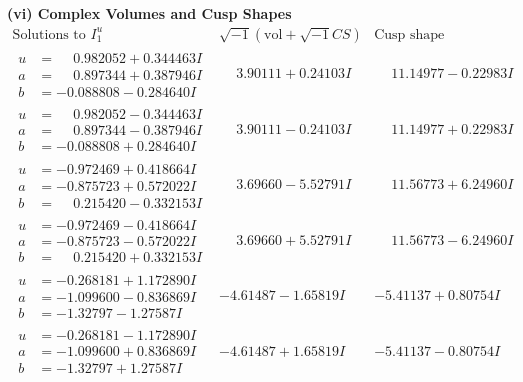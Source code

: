 \documentclass[1p]{elsarticle_modified}
\theoremstyle{definition}
\newcommand{\I}{\sqrt{-1}}
\begin{document}
\newpage\flushleft \textbf{(vi) Complex Volumes and Cusp Shapes}
$$\begin{array}{c|c|c}  
\text{Solutions to }I^u_{1}& \I (\text{vol} + \sqrt{-1}CS) & \text{Cusp shape}\\
 \hline 
\begin{aligned}
u &= \phantom{-}0.982052 + 0.344463 I \\
a &= \phantom{-}0.897344 + 0.387946 I \\
b &= -0.088808 - 0.284640 I\end{aligned}
 & \phantom{-}3.90111 + 0.24103 I & \phantom{-}11.14977 - 0.22983 I \\ \hline\begin{aligned}
u &= \phantom{-}0.982052 - 0.344463 I \\
a &= \phantom{-}0.897344 - 0.387946 I \\
b &= -0.088808 + 0.284640 I\end{aligned}
 & \phantom{-}3.90111 - 0.24103 I & \phantom{-}11.14977 + 0.22983 I \\ \hline\begin{aligned}
u &= -0.972469 + 0.418664 I \\
a &= -0.875723 + 0.572022 I \\
b &= \phantom{-}0.215420 - 0.332153 I\end{aligned}
 & \phantom{-}3.69660 - 5.52791 I & \phantom{-}11.56773 + 6.24960 I \\ \hline\begin{aligned}
u &= -0.972469 - 0.418664 I \\
a &= -0.875723 - 0.572022 I \\
b &= \phantom{-}0.215420 + 0.332153 I\end{aligned}
 & \phantom{-}3.69660 + 5.52791 I & \phantom{-}11.56773 - 6.24960 I \\ \hline\begin{aligned}
u &= -0.268181 + 1.172890 I \\
a &= -1.099600 - 0.836869 I \\
b &= -1.32797 - 1.27587 I\end{aligned}
 & -4.61487 - 1.65819 I & -5.41137 + 0.80754 I \\ \hline\begin{aligned}
u &= -0.268181 - 1.172890 I \\
a &= -1.099600 + 0.836869 I \\
b &= -1.32797 + 1.27587 I\end{aligned}
 & -4.61487 + 1.65819 I & -5.41137 - 0.80754 I \\ \hline\begin{aligned}

\end{aligned}
\end{array}$$
\end{document}
